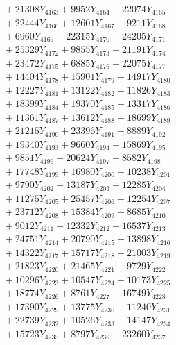 \documentclass[a4paper,10pt]{article}
\begin{document}
{\begin{align}
&\;  + 21308 Y_{4163} + 9952 Y_{4164} + 22074 Y_{4165} \\[0.3ex]
&\;  + 22444 Y_{4166} + 12601 Y_{4167} + 9211 Y_{4168} \\[0.5ex]\allowbreak
&\;  + 6960 Y_{4169} + 22315 Y_{4170} + 24205 Y_{4171} \\[0.3ex]
&\;  + 25329 Y_{4172} + 9855 Y_{4173} + 21191 Y_{4174} \\[0.3ex]
&\;  + 23472 Y_{4175} + 6885 Y_{4176} + 22075 Y_{4177} \\[0.3ex]
&\;  + 14404 Y_{4178} + 15901 Y_{4179} + 14917 Y_{4180} \\[0.3ex]
&\;  + 12227 Y_{4181} + 13122 Y_{4182} + 11826 Y_{4183} \\[0.3ex]
&\;  + 18399 Y_{4184} + 19370 Y_{4185} + 13317 Y_{4186} \\[0.3ex]
&\;  + 11361 Y_{4187} + 13612 Y_{4188} + 18699 Y_{4189} \\[0.3ex]
&\;  + 21215 Y_{4190} + 23396 Y_{4191} + 8889 Y_{4192} \\[0.3ex]
&\;  + 19340 Y_{4193} + 9660 Y_{4194} + 15869 Y_{4195} \\[0.3ex]
&\;  + 9851 Y_{4196} + 20624 Y_{4197} + 8582 Y_{4198} \\[0.5ex]\allowbreak
&\;  + 17748 Y_{4199} + 16980 Y_{4200} + 10238 Y_{4201} \\[0.3ex]
&\;  + 9790 Y_{4202} + 13187 Y_{4203} + 12285 Y_{4204} \\[0.3ex]
&\;  + 11275 Y_{4205} + 25457 Y_{4206} + 12254 Y_{4207} \\[0.3ex]
&\;  + 23712 Y_{4208} + 15384 Y_{4209} + 8685 Y_{4210} \\[0.3ex]
&\;  + 9012 Y_{4211} + 12332 Y_{4212} + 16537 Y_{4213} \\[0.3ex]
&\;  + 24751 Y_{4214} + 20790 Y_{4215} + 13898 Y_{4216} \\[0.3ex]
&\;  + 14322 Y_{4217} + 15717 Y_{4218} + 21003 Y_{4219} \\[0.3ex]
&\;  + 21823 Y_{4220} + 21465 Y_{4221} + 9729 Y_{4222} \\[0.3ex]
&\;  + 10296 Y_{4223} + 10547 Y_{4224} + 10173 Y_{4225} \\[0.3ex]
&\;  + 18774 Y_{4226} + 8761 Y_{4227} + 16749 Y_{4228} \\[0.5ex]\allowbreak
&\;  + 17390 Y_{4229} + 13775 Y_{4230} + 11240 Y_{4231} \\[0.3ex]
&\;  + 22739 Y_{4232} + 10526 Y_{4233} + 14147 Y_{4234} \\[0.3ex]
&\;  + 15723 Y_{4235} + 8797 Y_{4236} + 23260 Y_{4237} \\[0.3ex]

\end{align}}
\end{document}
